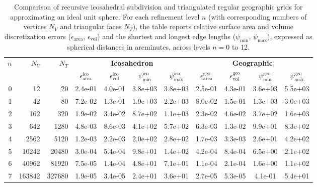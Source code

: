 \begin{table}[h!]
\centering
\setlength{\tabcolsep}{4.8pt}
\caption{Comparison of recursive icosahedral subdivision and triangulated regular geographic grids for approximating an ideal unit sphere. For each refinement level $n$ (with corresponding numbers of vertices $N_V$ and triangular faces $N_T$), the table reports relative surface area and volume discretization errors ($\epsilon_{\mathrm{area}}$, $\epsilon_{\mathrm{vol}}$) and the shortest and longest edge lengths ($\psi_{\mathrm{min}}$, $\psi_{\mathrm{max}}$), expressed as spherical distances in arcminutes, across levels $n = 0$ to $12$.}
\label{tab:ico_geo_sphere}
\begin{tabular}{rrrcccccccc}
\toprule
\multirow{2}{*}{$n$} &
\multirow{2}{*}{$N_{V}$} &
\multirow{2}{*}{$N_{T}$} &
\multicolumn{4}{c}{\textbf{Icosahedron}} &
\multicolumn{4}{c}{\textbf{Geographic}} \\
\cmidrule(lr){4-7} \cmidrule(lr){8-11}
& & &
$\epsilon_{\mathrm{area}}^{\mathrm{ico}}$ &
$\epsilon_{\mathrm{vol}}^{\mathrm{ico}}$ &
$\psi_{\mathrm{min}}^{\mathrm{ico}}$ &
$\psi_{\mathrm{max}}^{\mathrm{ico}}$ &
$\epsilon_{\mathrm{area}}^{\mathrm{geo}}$ &
$\epsilon_{\mathrm{vol}}^{\mathrm{geo}}$ &
$\psi_{\mathrm{min}}^{\mathrm{geo}}$ &
$\psi_{\mathrm{max}}^{\mathrm{geo}}$ \\
\midrule
0   & 12          & 20         & 2.4e-01 & 4.0e-01 & 3.8e+03 & 3.8e+03 & 2.5e-01 & 4.3e-01 & 3.6e+03 & 5.5e+03 \\
1   & 42          & 80         & 7.2e-02 & 1.3e-01 & 1.9e+03 & 2.2e+03 & 8.0e-02 & 1.5e-01 & 1.3e+03 & 3.0e+03 \\
2   & 162         & 320        & 1.9e-02 & 3.4e-02 & 8.7e+02 & 1.1e+03 & 2.3e-02 & 4.6e-02 & 3.7e+02 & 1.6e+03 \\
3   & 642         & 1280       & 4.8e-03 & 8.6e-03 & 4.1e+02 & 5.7e+02 & 6.3e-03 & 1.3e-02 & 9.9e+01 & 8.3e+02 \\
4   & 2562        & 5120       & 1.2e-03 & 2.2e-03 & 2.0e+02 & 2.8e+02 & 1.7e-03 & 3.3e-03 & 2.6e+01 & 4.2e+02 \\
5   & 10242       & 20480      & 3.0e-04 & 5.4e-04 & 9.8e+01 & 1.4e+02 & 4.2e-04 & 8.4e-04 & 6.5e+00 & 2.1e+02 \\
6   & 40962       & 81920      & 7.5e-05 & 1.4e-04 & 4.8e+01 & 7.1e+01 & 1.1e-04 & 2.1e-04 & 1.6e+00 & 1.1e+02 \\
7   & 163842      & 327680     & 1.9e-05 & 3.4e-05 & 2.4e+01 & 3.6e+01 & 2.7e-05 & 5.3e-05 & 4.1e-01 & 5.4e+01 \\

\end{tabular}
\end{table}
